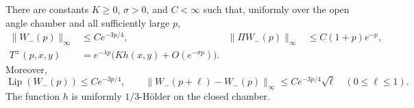 \begin{proposition}
\label{sp:transmission-asymptotics}
There are constants $K\ge0$, $\sigma>0$, and $C<\infty$ such that,
uniformly over the open angle chamber and all sufficiently large $p$,
\begin{align}
 \|W_-(p)\|_\infty&\le Ce^{-3p/4},
 &\|\Pi W_-(p)\|_\infty&\le C(1+p)e^{-p},
 \label{sp:odd-decay}\\
 T^\pm(p,x,y)&=e^{-\lambda p}
                   \bigl(Kh(x,y)+O(e^{-\sigma p})\bigr).
 \label{sp:rank-one-round}
\end{align}
Moreover,
\begin{equation}\label{sp:odd-regularity}
 \operatorname{Lip}(W_-(p))\le Ce^{-3p/4},\qquad
 \|W_-(p+\ell)-W_-(p)\|_\infty
        \le Ce^{-3p/4}\sqrt\ell\quad(0\le\ell\le1).
\end{equation}
The function $h$ is uniformly $1/3$-H\"older on the closed chamber.
\end{proposition}

